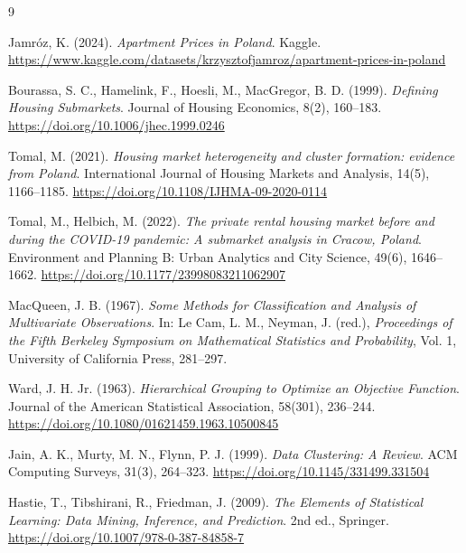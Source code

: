 \documentclass{report}
\begin{document}
\begin{thebibliography}{9}

Jamróz, K. (2024).
\textit{Apartment Prices in Poland}.
Kaggle.
\url{https://www.kaggle.com/datasets/krzysztofjamroz/apartment-prices-in-poland}

Bourassa, S. C., Hamelink, F., Hoesli, M., MacGregor, B. D. (1999).
\textit{Defining Housing Submarkets}.
Journal of Housing Economics, 8(2), 160--183.
\url{https://doi.org/10.1006/jhec.1999.0246}

Tomal, M. (2021).
\textit{Housing market heterogeneity and cluster formation: evidence from Poland}.
International Journal of Housing Markets and Analysis, 14(5), 1166--1185.
\url{https://doi.org/10.1108/IJHMA-09-2020-0114}

Tomal, M., Helbich, M. (2022).
\textit{The private rental housing market before and during the COVID-19 pandemic: A submarket analysis in Cracow, Poland}.
Environment and Planning B: Urban Analytics and City Science, 49(6), 1646--1662.
\url{https://doi.org/10.1177/23998083211062907}

MacQueen, J. B. (1967).
\textit{Some Methods for Classification and Analysis of Multivariate Observations}.
In: Le Cam, L. M., Neyman, J. (red.),
\textit{Proceedings of the Fifth Berkeley Symposium on Mathematical Statistics and Probability},
Vol. 1, University of California Press, 281--297.

Ward, J. H. Jr. (1963).
\textit{Hierarchical Grouping to Optimize an Objective Function}.
Journal of the American Statistical Association, 58(301), 236--244.
\url{https://doi.org/10.1080/01621459.1963.10500845}

Jain, A. K., Murty, M. N., Flynn, P. J. (1999).
\textit{Data Clustering: A Review}.
ACM Computing Surveys, 31(3), 264--323.
\url{https://doi.org/10.1145/331499.331504}

Hastie, T., Tibshirani, R., Friedman, J. (2009).
\textit{The Elements of Statistical Learning: Data Mining, Inference, and Prediction}.
2nd ed., Springer.
\url{https://doi.org/10.1007/978-0-387-84858-7}

\end{thebibliography}
\end{document}
